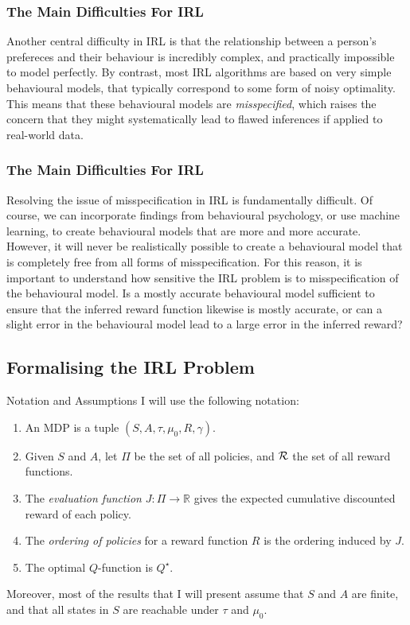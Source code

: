 \documentclass{beamer}
\begin{document}
\begin{frame}
    \frametitle{The Main Difficulties For IRL}
    \small
    Another central difficulty in IRL is that the relationship between a person's prefereces and their behaviour is incredibly complex, and practically impossible to model perfectly.
    \newline\newline
    By contrast, most IRL algorithms are based on very simple behavioural models, that typically correspond to some form of noisy optimality.
    \newline\newline
    This means that these behavioural models are \emph{misspecified}, which raises the concern that they might systematically lead to flawed inferences if applied to real-world data.
\end{frame}

\begin{frame}
    \frametitle{The Main Difficulties For IRL}
    \small
    Resolving the issue of misspecification in IRL is fundamentally difficult. Of course, we can incorporate findings from behavioural psychology, or use machine learning, to create behavioural models that are more and more accurate.
    However, it will never be realistically possible to create a behavioural model that is completely free from all forms of misspecification. 
    \newline\newline
    For this reason, it is important to understand how sensitive the IRL problem is to misspecification of the behavioural model. Is a mostly accurate behavioural model sufficient to ensure that the inferred reward function likewise is mostly accurate, or can a slight error in the behavioural model lead to a large error in the inferred reward?
\end{frame}

\subsection{Formalising the IRL Problem}
\begin{frame}{Notation and Assumptions}
    \small
    I will use the following notation:
    \begin{enumerate}
        \item An MDP is a tuple $(S,A,\tau,\mu_0,R,\gamma)$.
        \item Given $S$ and $A$, let $\Pi$ be the set of all policies, and $\mathcal{R}$ the set of all reward functions.
        \item The \emph{evaluation function} $J : \Pi \to \mathbb{R}$ gives the expected cumulative discounted reward of each policy.
        \item The \emph{ordering of policies} for a reward function $R$ is the ordering induced by $J$.
        \item The optimal $Q$-function is $Q^\star$.
    \end{enumerate}
    Moreover, most of the results that I will present assume that $S$ and $A$ are finite, and that all states in $S$ are reachable under $\tau$ and $\mu_0$.
\end{frame}
\end{document}
